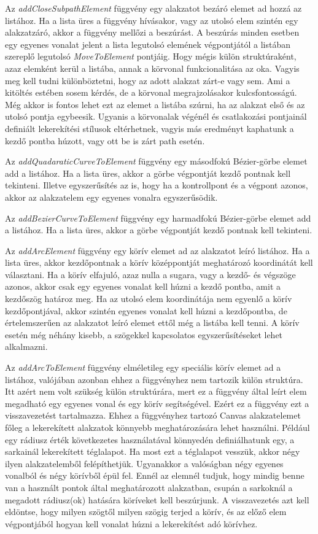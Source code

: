 \documentclass[12pt]{report}
\theoremstyle{definition}
\newcommand{\func}[1]{{\textsl{#1}}}
\begin{document}
Az \func{addCloseSubpathElement} függvény egy alakzatot bezáró elemet ad hozzá
az listához. Ha a lista üres a függvény hívásakor, vagy az utolsó elem szintén
egy alakzatzáró, akkor a függvény mellőzi a beszúrást. A beszúrás minden
esetben egy egyenes vonalat jelent a lista legutolsó elemének végpontjától a
listában szereplő legutolsó \func{MoveToElement} pontjáig. Hogy mégis külön
struktúraként, azaz elemként kerül a listába, annak a körvonal funkcionalitása
az oka. Vagyis meg kell tudni különböztetni, hogy az adott alakzat zárt-e vagy
sem. Ami a kitöltés estében sosem kérdés, de a körvonal megrajzolásakor
kulcsfontosságú. Még akkor is fontos lehet ezt az elemet a listába szúrni, ha
az alakzat első és az utolsó pontja egybeesik. Ugyanis a körvonalak
végénél és csatlakozási pontjainál definiált lekerekítési stílusok
eltérhetnek, vagyis más eredményt kaphatunk a kezdő pontba húzott, vagy ott be
is zárt path esetén.

Az \func{addQuadaraticCurveToElement} függvény egy másodfokú Bézier-görbe
elemet add a listához. Ha a lista üres, akkor a görbe végpontját kezdő pontnak
kell tekinteni. Illetve egyszerűsítés az is, hogy ha a kontrollpont és a
végpont azonos, akkor az alakzatelem egy egyenes vonalra egyszerűsödik.

Az \func{addBezierCurveToElement} függvény egy harmadfokú Bézier-görbe elemet
add a listához. Ha a lista üres, akkor a görbe végpontját kezdő pontnak kell
tekinteni.

Az \func{addArcElement} függvény egy körív elemet ad az alakzatot leíró
listához. Ha a lista üres, akkor kezdőpontnak a körív középpontját meghatározó
koordinátát kell választani. Ha a körív elfajuló, azaz nulla a sugara, vagy a
kezdő- és végszöge azonos, akkor csak egy egyenes vonalat kell húzni a kezdő
pontba, amit a kezdőszög határoz meg. Ha az utolsó elem koordinátája nem
egyenlő a körív kezdőpontjával, akkor szintén egyenes vonalat kell húzni a
kezdőpontba, de értelemszerűen az alakzatot leíró elemet ettől még a listába
kell tenni. A körív esetén még néhány kisebb, a szögekkel kapcsolatos
egyszerűsítéseket lehet alkalmazni.

Az \func{addArcToElement} függvény elméletileg egy speciális körív elemet ad a
listához, valójában azonban ehhez a függvényhez nem tartozik külön struktúra.
Itt azért nem volt szükség külön struktúrára, mert ez a függvény által leírt
elem megadható egy egyenes vonal és egy körív segítségével. Ezért ez a függvény
ezt a visszavezetést tartalmazza. Ehhez a függvényhez tartozó Canvas
alakzatelemet főleg a lekerekített alakzatok könnyebb meghatározására lehet
használni. Például egy rádiusz érték következetes használatával könnyedén
definiálhatunk egy, a sarkainál lekerekített téglalapot. Ha most ezt a
téglalapot vesszük, akkor négy ilyen alakzatelemből felépíthetjük. Ugyanakkor a
valóságban négy egyenes vonalból és négy körívből épül fel. Ennél az elemnél
tudjuk, hogy mindig benne van a használt pontok által meghatározott alakzatban,
csupán a sarkoknál a megadott rádiusz(ok) hatására köríveket kell beszúrjunk. A
visszavezetés azt kell eldöntse, hogy milyen szögtől milyen szögig terjed a
körív, és az előző elem végpontjából hogyan kell vonalat húzni a lekerekítést
adó körívhez.
\end{document}
